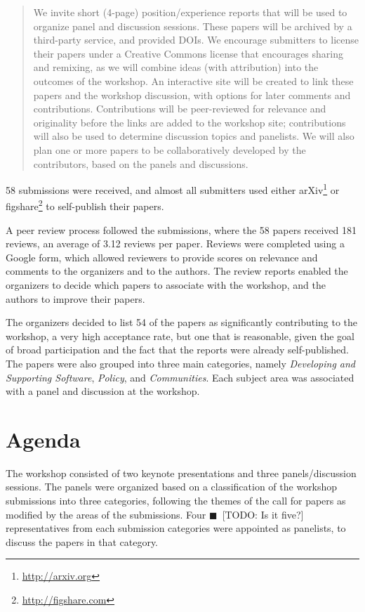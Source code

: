 \documentclass[11pt, oneside]{amsart}
\newcommand{\todo}[1]{{\color{blue}$\blacksquare$~\textsf{[TODO: #1]}}}
\begin{document}
\begin{quote}
We invite short (4-page) position/experience reports that will be used to organize panel and 
discussion sessions. These papers will be archived by a third-party service, and provided DOIs. We 
encourage submitters to license their papers under a Creative Commons license that encourages 
sharing and remixing, as we will combine ideas (with attribution) into the outcomes of the workshop. 
An interactive site will be created to link these papers and the workshop discussion, with options for 
later comments and contributions. Contributions will be peer-reviewed for relevance and originality 
before the links are added to the workshop site; contributions will also be used to determine 
discussion topics and panelists. We will also plan one or more papers to be collaboratively 
developed by the contributors, based on the panels and discussions.
\end{quote}

58 submissions were received, and almost all submitters used either 
arXiv\footnote{\url{http://arxiv.org}} or 
figshare\footnote{\url{http://figshare.com}} to self-publish their papers. 

A peer review process followed the submissions, where the 58 papers received 181 reviews, an 
average of 3.12 reviews per paper. Reviews were completed using a Google form, which allowed 
reviewers to provide scores on relevance and comments to the organizers and to the authors. The review reports enabled the organizers to decide which papers to associate with the workshop, and the authors to improve their papers.

The organizers decided to list 54 of the papers as significantly contributing to the workshop, a very 
high acceptance rate, but one that is reasonable, given the goal of broad participation and the fact 
that the reports were already self-published. The papers were also grouped into three main categories, namely \emph{Developing and Supporting Software}, \emph{Policy}, and \emph{Communities}. Each subject area was associated with a panel and discussion at the workshop.


\section{Agenda}

The workshop consisted of two keynote presentations and three panels/discussion sessions. The panels 
were organized based on a classification of the workshop submissions into three categories, following 
the themes of the call for papers as modified by the areas of the submissions. Four \todo{Is it five?} representatives from 
each submission categories were appointed as panelists, to discuss the papers in that category.
\end{document}
